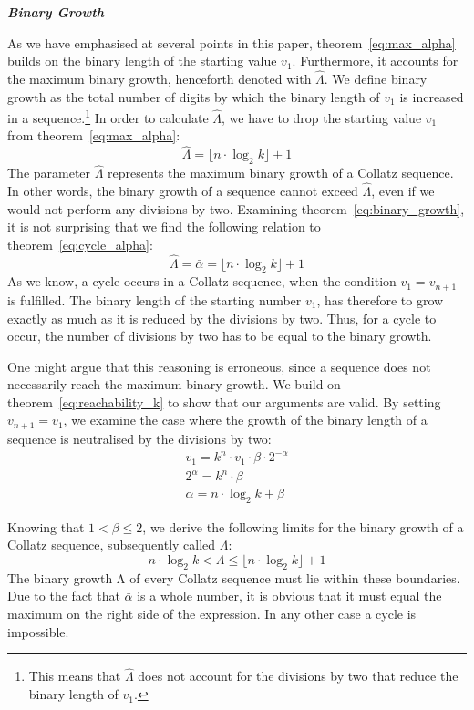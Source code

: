\documentclass{SciPress_2015}
\renewcommand{\subsection}[1]{\textit{\textbf{#1}}}
\begin{document}
\subsection{Binary Growth}
\par\noindent
As we have emphasised at several points in this paper, theorem~\ref{eq:max_alpha} builds on the binary length of the starting value $v_1$. Furthermore, it accounts for the maximum binary growth, henceforth denoted with $\hat\Lambda$. We define binary growth as the total number of digits by which the binary length of $v_1$ is increased in a sequence.\footnote{This means that $\hat\Lambda$ does not account for the divisions by two that reduce the binary length of $v_1$.} In order to calculate $\hat\Lambda$, we have to drop the starting value $v_1$ from theorem~\ref{eq:max_alpha}:
\begin{equation}
\label{eq:binary_growth}
\hat\Lambda=\lfloor n\cdot\log_2k\rfloor+1
\end{equation}
The parameter $\hat\Lambda$ represents the maximum binary growth of a Collatz sequence. In other words, the binary growth of a sequence cannot exceed $\hat\Lambda$, even if we would not perform any divisions by two. Examining theorem~\ref{eq:binary_growth}, it is not surprising that we find the following relation to theorem~\ref{eq:cycle_alpha}:
\[
\hat\Lambda=\bar\alpha=\lfloor n\cdot\log_2k\rfloor+1
\]
As we know, a cycle occurs in a Collatz sequence, when the condition $v_1=v_{n+1}$ is fulfilled. The binary length of the starting number $v_1$, has therefore to grow exactly as much as it is reduced by the divisions by two. Thus, for a cycle to occur, the number of divisions by two has to be equal to the binary growth.

\par\medskip
One might argue that this reasoning is erroneous, since a sequence does not necessarily reach the maximum binary growth. We build on theorem~\ref{eq:reachability_k} to show that our arguments are valid. By setting $v_{n+1}=v_1$, we examine the case where the growth of the binary length of a sequence is neutralised by the divisions by two:
\[
\begin{array}{c}
v_1=k^n\cdot v_1\cdot\beta\cdot2^{-\alpha}\\
2^{\alpha}=k^n\cdot\beta\\
\alpha=n\cdot\log_2k+\beta
\end{array}
\]

\newpage
\par\noindent
Knowing that $1<\beta\le2$, we derive the following limits for the binary growth of a Collatz sequence, subsequently called $\Lambda$:
\[
n\cdot\log_2k<\Lambda\le\lfloor n\cdot\log_2k\rfloor+1
\]
The binary growth Λ of every Collatz sequence must lie within these boundaries. Due to the fact that $\bar\alpha$ is a whole number, it is obvious that it must equal the maximum on the right side of the expression. In any other case a cycle is impossible.
\end{document}
